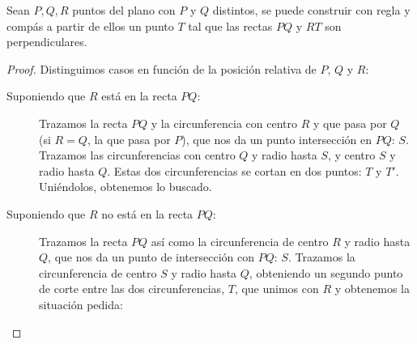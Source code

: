 \begin{lema}
    Sean $P,Q,R$ puntos del plano con $P$ y $Q$ distintos, se puede construir con regla y compás a partir de ellos un punto $T$  tal que las rectas $PQ$ y $RT$ son perpendiculares.
    \begin{proof}
        Distinguimos casos en función de la posición relativa de $P$, $Q$ y $R$:
        \begin{description}
            \item [Suponiendo que $R$ está en la recta $PQ$:] Trazamos la recta $PQ$ y la circunferencia con centro $R$ y que pasa por $Q$ (si $R=Q$, la que pasa por $P$), que nos da un punto intersección en $PQ$: $S$. Trazamos las circunferencias con centro $Q$ y radio hasta $S$, y centro $S$ y radio hasta $Q$. Estas dos circunferencias se cortan en dos puntos: $T$ y $T'$. Uniéndolos, obtenemos lo buscado.
            \begin{figure}[H] %
                \centering
            \end{figure}
            \item [Suponiendo que $R$ no está en la recta $PQ$:]
                Trazamos la recta $PQ$ así como la circunferencia de centro $R$ y radio hasta $Q$, que nos da un punto de intersección con $PQ$: $S$. Trazamos la circunferencia de centro $S$ y radio hasta $Q$, obteniendo un segundo punto de corte entre las dos circunferencias, $T$, que unimos con $R$ y obtenemos la situación pedida:
            \begin{figure}[H]
                \centering
\end{figure}
\end{description}
\end{proof}
\end{lema}
